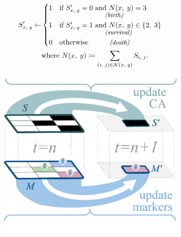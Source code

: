 \begin{figure}

\begin{minipage}[c]{1.0\linewidth}%
\vspace*{0pt}%
\begin{subfigure}[]{0.35\linewidth}
    \centering
\begin{align*}
    S_{\fontsize{2}{12} \selectfont x,\; y}'
    \gets&
    \begin{cases}
        1 & \text{if } S_{\fontsize{2}{12} \selectfont x,\; y}' = 0 \text{ and } N(x,\; y) = 3\\[-1ex]
          &\hspace{15ex}\text{\small\textit{(birth)}}\\
        1 & \text{if } S_{\fontsize{2}{12} \selectfont x,\; y}' = 1 \text{ and } N(x,\; y) \in \{2,\; 3\}\\[-1ex]
          &\hspace{15ex}\text{\small\textit{(survival)}}\\
        0 & \text{otherwise} \hspace{7ex}\text{\small\textit{(death)}}
    \end{cases}\\
    & \text{where } N(x,\; y) \coloneqq \sum_{(i,\; j) \in \mathcal{N}(x,\; y)} S_{\fontsize{2}{12} \selectfont i,\; j}.
\end{align*}
\vspace{-3.7ex}
    \includegraphics[width=\linewidth, trim={0 0.5cm 0 0}, clip]{img/hstrat-synthesis-ca-update.pdf}\vspace{-2.5ex}

\end{subfigure}
\end{minipage}
\end{figure}
